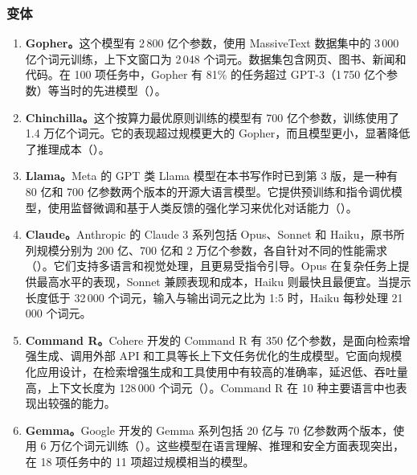 \subsubsection{变体}
\begin{enumerate}
\item \textbf{Gopher。}这个模型有 2\,800 亿个参数，使用 MassiveText 数据集中的 3\,000 亿个词元训练，上下文窗口为 2\,048 个词元。数据集包含网页、图书、新闻和代码。在 100 项任务中，Gopher 有 81\% 的任务超过 GPT-3（1\,750 亿个参数）等当时的先进模型（）。
\item \textbf{Chinchilla。}这个按算力最优原则训练的模型有 700 亿个参数，训练使用了 1.4 万亿个词元。它的表现超过规模更大的 Gopher，而且模型更小，显著降低了推理成本（）。
\item \textbf{Llama。}Meta 的 GPT 类 Llama 模型在本书写作时已到第 3 版，是一种有 80 亿和 700 亿参数两个版本的开源大语言模型。它提供预训练和指令调优模型，使用监督微调和基于人类反馈的强化学习来优化对话能力（）。
\item \textbf{Claude。}Anthropic 的 Claude 3 系列包括 Opus、Sonnet 和 Haiku，原书所列规模分别为 200 亿、700 亿和 2 万亿个参数，各自针对不同的性能需求（）。它们支持多语言和视觉处理，且更易受指令引导。Opus 在复杂任务上提供最高水平的表现，Sonnet 兼顾表现和成本，Haiku 则最快且最便宜。当提示长度低于 32\,000 个词元，输入与输出词元之比为 1:5 时，Haiku 每秒处理 21\,000 个词元。
\item \textbf{Command R。}Cohere 开发的 Command R 有 350 亿个参数，是面向检索增强生成、调用外部 API 和工具等长上下文任务优化的生成模型。它面向规模化应用设计，在检索增强生成和工具使用中有较高的准确率，延迟低、吞吐量高，上下文长度为 128\,000 个词元（）。Command R 在 10 种主要语言中也表现出较强的能力。
\item \textbf{Gemma。}Google 开发的 Gemma 系列包括 20 亿与 70 亿参数两个版本，使用 6 万亿个词元训练（）。这些模型在语言理解、推理和安全方面表现突出，在 18 项任务中的 11 项超过规模相当的模型。
\end{enumerate}
